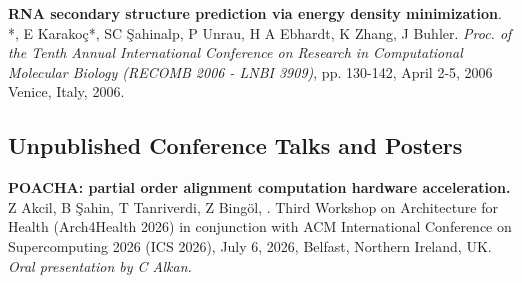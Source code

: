 



\vspace{-.2cm}
{\bf RNA secondary structure prediction via energy density minimization}.
\calkan{}*, E Karako\c{c}*, SC \c{S}ahinalp, P Unrau,
H A Ebhardt, K Zhang, J Buhler.
{\em Proc. of the Tenth Annual International Conference on Research in Computational Molecular Biology
  (RECOMB 2006 - LNBI 3909)}, pp. 130-142,
  April 2-5, 2006 Venice, Italy, 2006.




    


\vspace{-.4cm}
\subsection{\small \sc  Unpublished Conference Talks and Posters}

\vspace{-.2cm}

\textbf{POACHA: partial order alignment computation hardware acceleration.} Z Akcil, B Şahin, T Tanriverdi, Z Bingöl, \calkan{}. Third Workshop on Architecture for Health (Arch4Health 2026) in conjunction with ACM International Conference on Supercomputing 2026 (ICS 2026), July 6, 2026, Belfast, Northern Ireland, UK. \textit{Oral presentation by C Alkan.}

